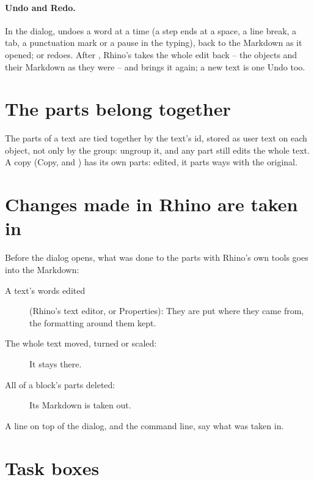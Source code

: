 \paragraph{Undo and Redo.} In the dialog,  undoes a word at a time (a step ends at a space, a line break,
a tab, a punctuation mark or a pause in the typing), back to the Markdown as it opened;  or
 redoes. After , Rhino's  takes the whole edit back -- the objects and their
Markdown as they were -- and  brings it again; a new text is one Undo too.


\section{The parts belong together}

The parts of a text are tied together by the text's id, stored as user text on each object, not only by the group:
ungroup it, and any part still edits the whole text. A copy (Copy,  and ) has its own parts:
edited, it parts ways with the original.

\section{Changes made in Rhino are taken in}

Before the dialog opens, what was done to the parts with Rhino's own tools goes into the Markdown:

\begin{description}
  \item[A text's words edited] (Rhino's text editor, or Properties): They are put where they came from, the formatting
        around them kept.
  \item[The whole text moved, turned or scaled:] It stays there.
  \item[All of a block's parts deleted:] Its Markdown is taken out.
\end{description}

A line on top of the dialog, and the command line, say what was taken in.

\section{Task boxes}

